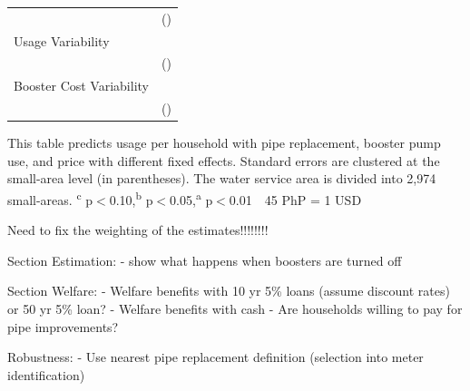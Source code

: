 \documentclass[12pt,table]{article}
\newcommand{\regtext}{
Standard errors are clustered at the small-area level (in parentheses).  The water service area is divided into 2,974 small-areas.
\textsuperscript{c} p$<$0.10,\textsuperscript{b} p$<$0.05,\textsuperscript{a} p$<$0.01 \,\,
}
\begin{document}
\begin{table}[h!]
\begin{threeparttable}
\begin{tabular}{@{}l*{1}{c}@{}}
 						& () \\[.5em]
Usage Variability &  \\
 						& () \\[.5em]
Booster Cost Variability &  \\
 						& () \\
\bottomrule
\end{tabular}
\begin{tablenotes}
\footnotesize
\item This table predicts usage per household with pipe replacement, booster pump use, and price with different fixed effects.   \regtext 45 PhP = 1 USD \,\,
\end{tablenotes}
\end{threeparttable}
\end{table}







Need to fix the weighting of the estimates!!!!!!!!






Section Estimation:
	- show what happens when boosters are turned off


Section Welfare:
	- Welfare benefits with 10 yr 5\% loans (assume discount rates) or 50 yr 5\% loan?
	- Welfare benefits with cash
	- Are households willing to pay for pipe improvements?


Robustness:
	- Use nearest pipe replacement definition (selection into meter identification)



\end{document}
